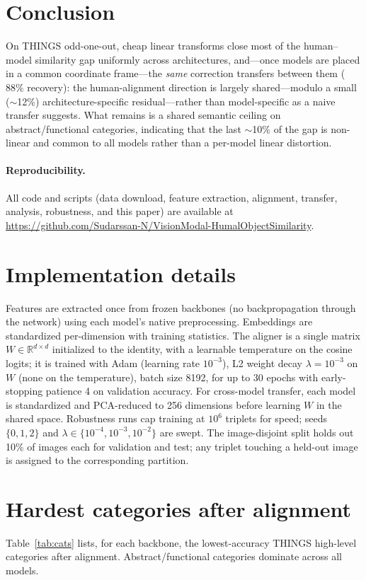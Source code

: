 \documentclass{article}
\begin{document}
\section{Conclusion}
On THINGS odd-one-out, cheap linear transforms close most of the human--model
similarity gap uniformly across architectures, and---once models are placed in a
common coordinate frame---the \emph{same} correction transfers between them
($88\%$ recovery): the human-alignment direction is largely shared---modulo a small
($\sim$12\%) architecture-specific residual---rather than model-specific as a naive
transfer suggests. What remains is a shared semantic ceiling
on abstract/functional categories, indicating that the last $\sim$10\% of the gap is
non-linear and common to all models rather than a per-model linear distortion.

\paragraph{Reproducibility.} All code and scripts (data download, feature
extraction, alignment, transfer, analysis, robustness, and this paper) are
available at
\url{https://github.com/Sudarssan-N/VisionModal-HumalObjectSimilarity}.

\appendix
\section{Implementation details}\label{app:impl}
Features are extracted once from frozen backbones (no backpropagation through the
network) using each model's native preprocessing. Embeddings are standardized
per-dimension with training statistics. The aligner is a single matrix
$W\in\mathbb{R}^{d\times d}$ initialized to the identity, with a learnable
temperature on the cosine logits; it is trained with Adam (learning rate
$10^{-3}$), L2 weight decay $\lambda{=}10^{-3}$ on $W$ (none on the temperature),
batch size 8192, for up to 30 epochs with early-stopping patience 4 on validation
accuracy. For cross-model transfer, each model is standardized and PCA-reduced to
256 dimensions before learning $W$ in the shared space. Robustness runs cap
training at $10^{6}$ triplets for speed; seeds $\{0,1,2\}$ and
$\lambda\in\{10^{-4},10^{-3},10^{-2}\}$ are swept. The image-disjoint split holds
out 10\% of images each for validation and test; any triplet touching a held-out
image is assigned to the corresponding partition.

\section{Hardest categories after alignment}\label{app:cats}
Table~\ref{tab:cats} lists, for each backbone, the lowest-accuracy THINGS
high-level categories after alignment. Abstract/functional categories dominate
across all models.
\end{document}
